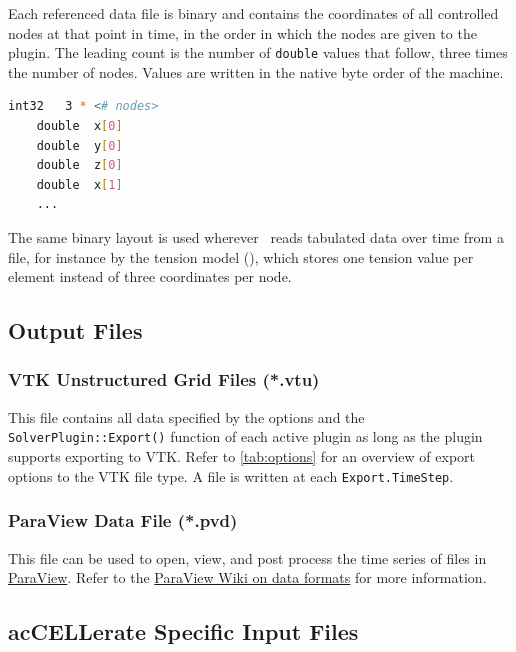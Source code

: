 Each referenced data file is binary and contains the coordinates of all controlled nodes at that point in time, in the order in which the nodes are given to the plugin.
The leading count is the number of \verb|double| values that follow, \ie three times the number of nodes.
Values are written in the native byte order of the machine.
\begin{lstlisting}[language=Bash,caption=Target surface data file (*.dat)]
    int32   3 * <# nodes>
    double  x[0]
    double  y[0]
    double  z[0]
    double  x[1]
    ...
\end{lstlisting}

The same binary layout is used wherever \CM~reads tabulated data over time from a file, for instance by the  tension model (), which stores one tension value per element instead of three coordinates per node.

\subsection{Output Files}
\label{sec:outfiles}

\subsubsection{VTK Unstructured Grid Files (*.vtu)}
\label{subsubsec:VTK}

This file contains all data specified by the  options and the \verb|SolverPlugin::Export()| function of each active plugin as long as the plugin supports exporting to VTK.
Refer to \autoref{tab:options} for an overview of export options to the VTK file type.
A file is written at each \verb|Export.TimeStep|.

\subsubsection{ParaView Data File (*.pvd)}

This file can be used to open, view, and post process the time series of  files in \href{https://www.paraview.org/}{ParaView}. 
Refer to the \href{https://www.paraview.org/Wiki/ParaView/Data_formats#PVD_File_Format}{ParaView Wiki on data formats} for more information.

\subsection{acCELLerate Specific Input Files}
\label{files:acCELLerate}

